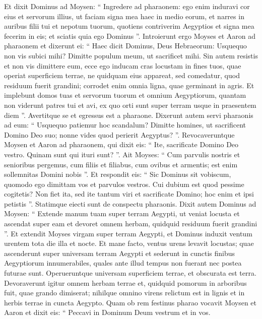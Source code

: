 \begin{biblechapter}
\begin{biblechapter}
\begin{biblechapter}
\begin{biblechapter}
\begin{biblechapter}
\begin{biblechapter}
\begin{biblechapter}
\begin{biblechapter}
\begin{biblechapter}
\begin{biblechapter}
 \verse Et dixit Dominus ad Moysen: “ Ingredere ad pharaonem: ego enim induravi cor eius et servorum illius, ut faciam signa mea haec in medio eorum, 
 \verse et narres in auribus filii tui et nepotum tuorum, quotiens contriverim Aegyptios et signa mea fecerim in eis; et sciatis quia ego Dominus ”.
 \verse Introierunt ergo Moyses et Aaron ad pharaonem et dixerunt ei: “ Haec dicit Dominus, Deus Hebraeorum: Usquequo non vis subici mihi? Dimitte populum meum, ut sacrificet mihi. 
 \verse Sin autem resistis et non vis dimittere eum, ecce ego inducam cras locustam in fines tuos, 
 \verse quae operiat superficiem terrae, ne quidquam eius appareat, sed comedatur, quod residuum fuerit grandini; corrodet enim omnia ligna, quae germinant in agris. 
 \verse Et implebunt domos tuas et servorum tuorum et omnium Aegyptiorum, quantam non viderunt patres tui et avi, ex quo orti sunt super terram usque in praesentem diem ”. Avertitque se et egressus est a pharaone.
 \verse Dixerunt autem servi pharaonis ad eum: “ Usquequo patiemur hoc scandalum? Dimitte homines, ut sacrificent Domino Deo suo; nonne vides quod perierit Aegyptus? ”. 
 \verse Revocaveruntque Moysen et Aaron ad pharaonem, qui dixit eis: “ Ite, sacrificate Domino Deo vestro. Quinam sunt qui ituri sunt? ”. 
 \verse Ait Moyses: “ Cum parvulis nostris et senioribus pergemus, cum filiis et filiabus, cum ovibus et armentis; est enim sollemnitas Domini nobis ”. 
 \verse Et respondit eis: “ Sic Dominus sit vobiscum, quomodo ego dimittam vos et parvulos vestros. Cui dubium est quod pessime cogitetis? 
 \verse Non fiet ita, sed ite tantum viri et sacrificate Domino; hoc enim et ipsi petistis ”. Statimque eiecti sunt de conspectu pharaonis.
 \verse Dixit autem Dominus ad Moysen: “ Extende manum tuam super terram Aegypti, ut veniat locusta et ascendat super eam et devoret omnem herbam, quidquid residuum fuerit grandini ”. 
\verse Et extendit Moyses virgam super terram Aegypti, et Dominus induxit ventum urentem tota die illa et nocte. Et mane facto, ventus urens levavit locustas; 
\verse quae ascenderunt super universam terram Aegypti et sederunt in cunctis finibus Aegyptiorum innumerabiles, quales ante illud tempus non fuerant nec postea futurae sunt. 
\verse Operueruntque universam superficiem terrae, et obscurata est terra. Devoraverunt igitur omnem herbam terrae et, quidquid pomorum in arboribus fuit, quae grando dimiserat; nihilque omnino virens relictum est in lignis et in herbis terrae in cuncta Aegypto.
 \verse Quam ob rem festinus pharao vocavit Moysen et Aaron et dixit eis: “ Peccavi in Dominum Deum vestrum et in vos. 

\end{biblechapter}
\end{biblechapter}
\end{biblechapter}
\end{biblechapter}
\end{biblechapter}
\end{biblechapter}
\end{biblechapter}
\end{biblechapter}
\end{biblechapter}
\end{biblechapter}
